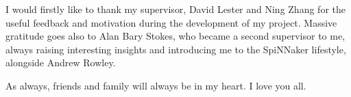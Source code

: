 { \par}
\vspace{5mm}
I would firstly like to thank my supervisor, David Lester and Ning Zhang for the useful feedback and motivation during the development of my project. Massive gratitude goes also to Alan Bary Stokes, who became a second supervisor to me, always raising interesting insights and introducing me to the SpiNNaker lifestyle, alongside Andrew Rowley.

As always, friends and family will always be in my heart. I love you all.